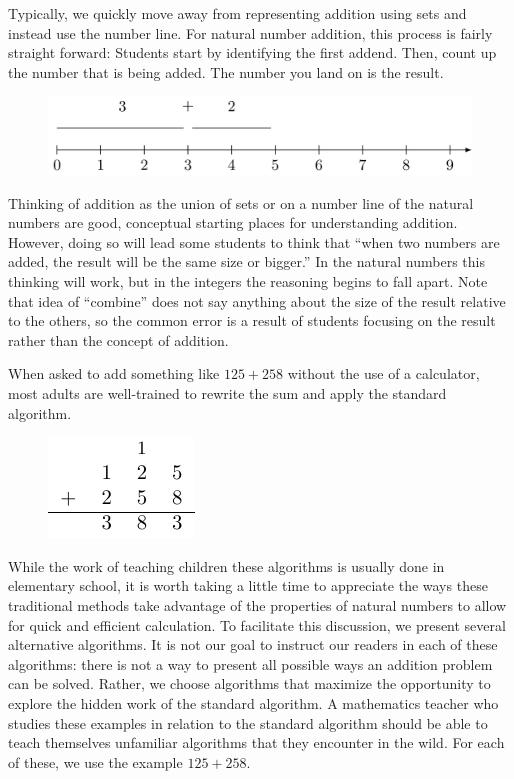 \documentclass[
]{book}
\theoremstyle{definition}
\theoremstyle{definition}
\theoremstyle{definition}
\theoremstyle{remark}
\begin{document}
Typically, we quickly move away from representing addition using sets and instead use the number line. For natural number addition, this process is fairly straight forward: Students start by identifying the first addend. Then, count up the number that is being added. The number you land on is the result.

\begin{figure}

{\centering \includegraphics[width=0.6\linewidth]{tikz/addition-model-numberline} 

}

\end{figure}

Thinking of addition as the union of sets or on a number line of the natural numbers are good, conceptual starting places for understanding addition. However, doing so will lead some students to think that ``when two numbers are added, the result will be the same size or bigger.'' In the natural numbers this thinking will work, but in the integers the reasoning begins to fall apart. Note that idea of ``combine'' does not say anything about the size of the result relative to the others, so the common error is a result of students focusing on the result rather than the concept of addition.

When asked to add something like \(125+258\) without the use of a calculator, most adults are well-trained to rewrite the sum and apply the standard algorithm.

\begin{figure}

{\centering \includegraphics[width=0.2\linewidth]{tikz/addition-model-algorithm} 

}

\end{figure}

While the work of teaching children these algorithms is usually done in elementary school, it is worth taking a little time to appreciate the ways these traditional methods take advantage of the properties of natural numbers to allow for quick and efficient calculation. To facilitate this discussion, we present several alternative algorithms. It is not our goal to instruct our readers in each of these algorithms: there is not a way to present all possible ways an addition problem can be solved. Rather, we choose algorithms that maximize the opportunity to explore the hidden work of the standard algorithm. A mathematics teacher who studies these examples in relation to the standard algorithm should be able to teach themselves unfamiliar algorithms that they encounter in the wild. For each of these, we use the example \(125+258\).
\end{document}
